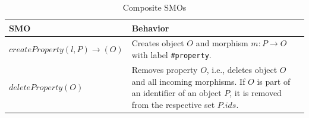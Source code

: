 \begin{table}[htp!]
\centering
\caption{Composite SMOs}
\scriptsize
\def\arraystretch{1.47}
\begin{tabular}{
    >{\raggedright\arraybackslash}p{35mm}%
    >{\raggedright\arraybackslash}p{84mm}%
    }
\toprule
\textbf{SMO}  
    & \textbf{Behavior}  
\\
\midrule

$createProperty(l, P) \rightarrow (O)$  
    & Creates object $O$ and morphism $m: P \rightarrow O$ with label \texttt{\#property}.
    \\
$deleteProperty(O)$  
    & Removes property $O$, i.e., deletes object $O$ and all incoming morphisms. If $O$ is part of an identifier of an object $P$, it is removed from the respective set $P.ids$.
    \\
    

\end{tabular}
\end{table}
